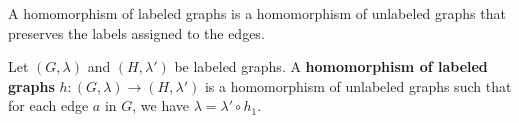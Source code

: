 A homomorphism of labeled graphs is a homomorphism of unlabeled graphs that preserves the labels assigned to the edges.
\begin{definition}
    \label{def:graph:homomorphism}
    Let \( (G,\lambda) \) and \( (H,\lambda') \) be labeled graphs. A \textbf{homomorphism of labeled graphs} \( h:(G,\lambda) \rightarrow (H,\lambda') \) is a homomorphism of unlabeled graphs such that for each edge \( a \) in \( G \), we have \( \lambda = \lambda' \circ h_1 \).
\end{definition}